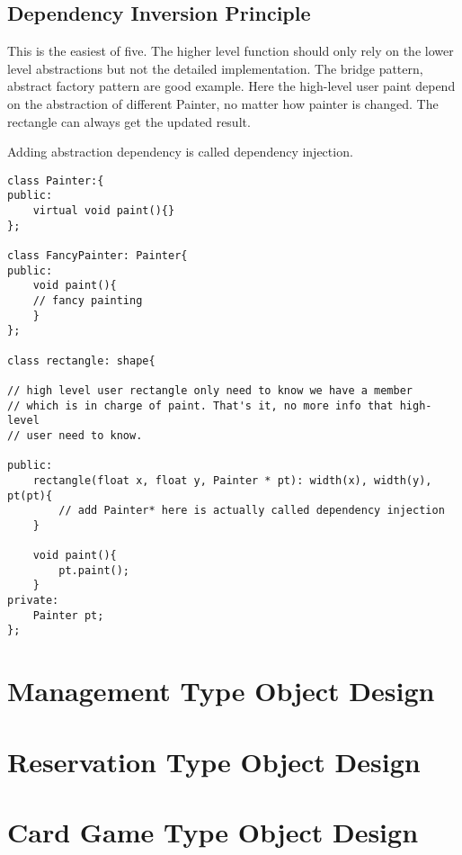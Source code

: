\documentclass[11pt, oneside]{article}   	%
\begin{document}
\subsection{Dependency Inversion Principle}

This is the easiest of five. The higher level function should only rely on the lower level abstractions but not the detailed implementation.
The bridge pattern, abstract factory pattern are good example. Here the high-level user paint depend on the abstraction of different Painter,
no matter how painter is changed. The rectangle can always get the updated result.

Adding abstraction dependency is called dependency injection.

\begin{lstlisting}
class Painter:{
public:
	virtual void paint(){}
};

class FancyPainter: Painter{
public:
	void paint(){
	// fancy painting
	}
};

class rectangle: shape{

// high level user rectangle only need to know we have a member
// which is in charge of paint. That's it, no more info that high-level
// user need to know.

public:
	rectangle(float x, float y, Painter * pt): width(x), width(y), pt(pt){
		// add Painter* here is actually called dependency injection
	}

	void paint(){
		pt.paint();
	}
private:
	Painter pt;
};

\end{lstlisting}

\newpage
\section{Management Type Object Design}
\section{Reservation Type Object Design}
\section{Card Game Type Object Design}
\end{document}
